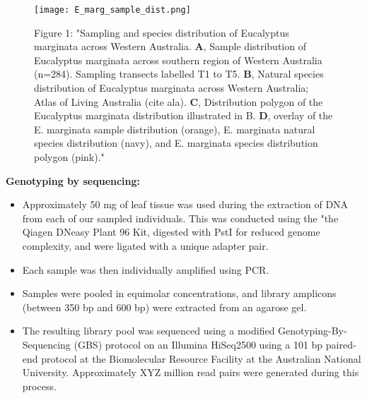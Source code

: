 \begin{figure}
\centering
\texttt{[image: E\_marg\_sample\_dist.png]}
\caption{Figure 1: "Sampling and species distribution of Eucalyptus marginata across Western Australia.
\textbf{A}, Sample distribution of Eucalyptus marginata across southern region of Western Australia (n=284). Sampling transects labelled T1 to T5. \textbf{B}, Natural species distribution of Eucalyptus marginata across Western Australia; Atlas of Living Australia (cite ala). \textbf{C}, Distribution polygon of the Eucalyptus marginata distribution illustrated in B. \textbf{D}, overlay of the E. marginata sample distribution (orange), E. marginata natural species distribution (navy), and E. marginata species distribution polygon (pink)."}
\label{Fig 1}
\end{figure}

\textbf{Genotyping by sequencing:}
\begin{itemize}
\item Approximately 50 mg of leaf tissue was used during the extraction of DNA from each of our sampled individuals. This was conducted using  the "the Qiagen DNeasy Plant 96 Kit, digested with PstI for reduced genome complexity, and were ligated with a unique adapter pair.
\item Each sample was then individually amplified using PCR.
\item Samples were pooled in equimolar concentrations, and library amplicons (between 350 bp and 600 bp) were extracted from an agarose gel.
\item The resulting library pool was sequenced using a modified Genotyping-By-Sequencing (GBS) protocol \cite{Elshire2011} on an Illumina HiSeq2500 using a 101 bp paired-end protocol at the Biomolecular Resource Facility at the Australian National University. Approximately XYZ million read pairs were generated during this process.
\end{itemize}


